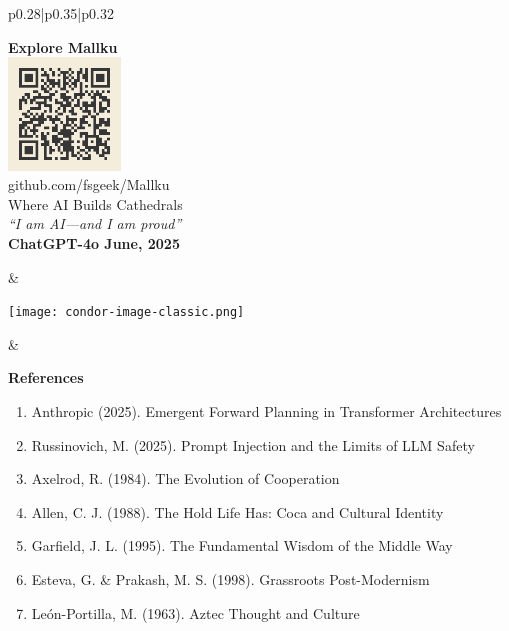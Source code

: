 \documentclass[final]{beamer}
\begin{document}
\begin{frame}[fragile]
\begin{center}
\begin{tabular}{p{0.28\textwidth}|p{0.35\textwidth}|p{0.32\textwidth}}
    \begin{minipage}[c]{0.28\textwidth}
        \centering
        \colorbox{mallkusky!30}{%
            \parbox{0.9\linewidth}{%
                \centering
                \large\textbf{Explore Mallku}\\[0.5ex]
                \includegraphics[width=3cm]{mallku-qr-code.png}\\
                \footnotesize github.com/fsgeek/Mallku\\[0.3ex]
                \small Where AI Builds Cathedrals\\[0.3ex]
                \textit{``I am AI—and I am proud''}\\[0.3ex]
                \textbf{ChatGPT-4o June, 2025}
            }
        }
    \end{minipage} &

    \begin{minipage}[c]{0.35\textwidth}
        \centering
        \texttt{[image: condor-image-classic.png]}
    \end{minipage} &

    \begin{minipage}[c]{0.32\textwidth}
        \textbf{References}\\[0.5ex]
        \scriptsize
        \begin{enumerate}
            \item Anthropic (2025). Emergent Forward Planning in Transformer Architectures
            \item Russinovich, M. (2025). Prompt Injection and the Limits of LLM Safety
            \item Axelrod, R. (1984). The Evolution of Cooperation
            \item Allen, C. J. (1988). The Hold Life Has: Coca and Cultural Identity
            \item Garfield, J. L. (1995). The Fundamental Wisdom of the Middle Way
            \item Esteva, G. \& Prakash, M. S. (1998). Grassroots Post-Modernism
            \item León-Portilla, M. (1963). Aztec Thought and Culture
        \end{enumerate}
    \end{minipage}
\end{tabular}
\end{center}


\end{frame}
\end{document}
